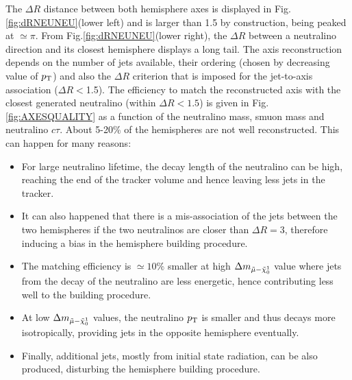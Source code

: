 \documentclass{cernatlasnote}
\newcommand{\dmass}{$\Delta m_{\Tilde{\mu}-\Tilde{\chi}^{1}_{0}}$\xspace}
\newcommand{\pt}{$p_{\text T}$\xspace}
\begin{document}
The $\Delta R$ distance between both hemisphere axes is displayed in Fig.\ref{fig:dRNEUNEU}(lower left) and is larger than 1.5 by construction, being peaked at $\simeq\pi$.
From Fig.\ref{fig:dRNEUNEU}(lower right), the $\Delta R$ between a neutralino direction and its closest hemisphere displays a long tail. 
The axis reconstruction depends on the number of jets available, their ordering (chosen by decreasing value of \pt) and also the $\Delta R$ criterion that is imposed for the jet-to-axis association ($\Delta R <$1.5).
The efficiency to match the reconstructed axis with the closest generated neutralino (within $\Delta R < 1.5$) is given in Fig.\ref{fig:AXESQUALITY} as a function of the neutralino mass, smuon mass and neutralino $c\tau$. About 5-20\% of the hemispheres are not well reconstructed. This can happen for many reasons: 
\begin{itemize}
    \item For large neutralino lifetime, the decay length of the neutralino can be high, reaching the end of the tracker volume and hence leaving less jets in the tracker. 
    \item It can also happened that there is a mis-association of the jets between the two hemispheres if the two neutralinos are closer than $\Delta R = 3$, therefore inducing a bias in the hemisphere building procedure. 
    \item The matching efficiency is $\simeq10\%$ smaller at high \dmass value where jets from the decay of the neutralino are less energetic, hence contributing less well to the building procedure.
    \item At low \dmass values, the neutralino \pt is smaller and thus decays more isotropically, providing jets in the opposite hemisphere eventually.
    \item Finally, additional jets, mostly from initial state radiation, can be also produced, disturbing the hemisphere building procedure.
\end{itemize}
\end{document}
